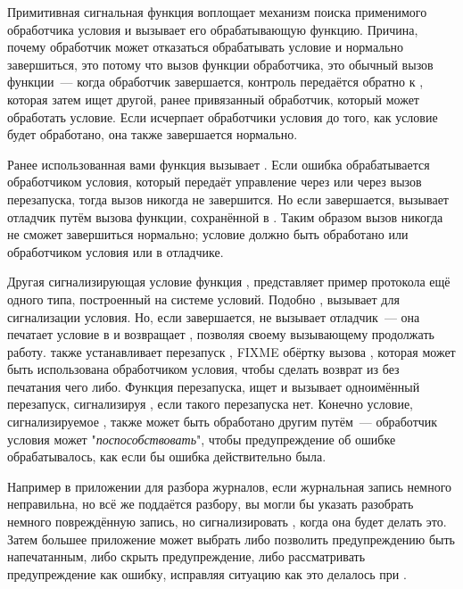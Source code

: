 Примитивная сигнальная функция  воплощает механизм поиска применимого
обработчика условия и вызывает его обрабатывающую функцию. Причина, почему обработчик
может отказаться обрабатывать условие и нормально завершиться, это потому что вызов
функции обработчика, это обычный вызов функции~--- когда обработчик завершается, контроль
передаётся обратно к , которая затем ищет другой, ранее привязанный
обработчик, который может обработать условие. Если  исчерпает обработчики
условия до того, как условие будет обработано, она также завершается нормально.

Ранее использованная вами функция  вызывает . Если ошибка
обрабатывается обработчиком условия, который передаёт управление через 
или через вызов перезапуска, тогда вызов  никогда не завершится. Но если
 завершается,  вызывает отладчик путём вызова функции,
сохранённой в . Таким образом вызов  никогда не сможет
завершиться нормально; условие должно быть обработано или обработчиком условия или в
отладчике.

Другая сигнализирующая условие функция , представляет пример протокола ещё
одного типа, построенный на системе условий. Подобно ,  вызывает
 для сигнализации условия. Но, если  завершается,  не
вызывает отладчик~--- она печатает условие в  и возвращает
, позволяя своему вызывающему продолжать работу.  также устанавливает
перезапуск , FIXME обёртку вызова , которая может быть
использована обработчиком условия, чтобы сделать возврат из  без печатания чего
либо. Функция  перезапуска, ищет и вызывает одноимённый перезапуск,
сигнализируя , если такого перезапуска нет. Конечно условие,
сигнализируемое , также может быть обработано другим путём~--- обработчик
условия может "\textit{поспособствовать}", чтобы предупреждение об ошибке обрабатывалось,
как если бы ошибка действительно была.

Например в приложении для разбора журналов, если журнальная запись немного неправильна, но
всё же поддаётся разбору, вы могли бы указать  разобрать немного
повреждённую запись, но сигнализировать , когда она будет делать это. Затем
большее приложение может выбрать либо позволить предупреждению быть напечатанным, либо
скрыть предупреждение, либо рассматривать предупреждение как ошибку, исправляя ситуацию
как это делалось при .

